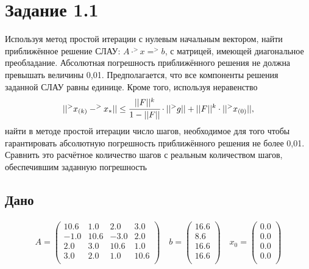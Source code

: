\documentclass[letterpaper, 11pt]{extarticle}
\begin{document}


\section*{Задание 1.1}

Используя метод простой итерации с нулевым начальным вектором, найти приближённое
решение СЛАУ: $A \cdot ^>x = ^>b$, с матрицей, имеющей диагональное преобладание.
Абсолютная погрешность приближённого решения не должна превышать величины 0,01.
Предполагается, что все компоненты решения заданной СЛАУ равны единице.
Кроме того, используя неравенство\\
\begin{equation*}
    ||^>x_{(k)} - ^>x_{*}|| \leq 
    \cfrac{||F||^k}{1 - ||F||} \cdot ||^>g|| + ||F||^k \cdot ||^>x_{(0)}||,
\end{equation*}
найти в методе простой итерации число шагов,
необходимое для того чтобы гарантировать абсолютную погрешность приближённого
решения не более 0,01. Сравнить это расчётное количество шагов с реальным количеством
шагов, обеспечившим заданную погрешность

\subsection*{Дано}

\begin{align*}
    A = \begin{pmatrix}
        10.6 & 1.0 & 2.0 & 3.0 \\
        -1.0 & 10.6 & -3.0 & 2.0 \\
        2.0 & 3.0 & 10.6 & 1.0 \\
        3.0 & 2.0 & 1.0 & 10.6 \\
    \end{pmatrix}
    \quad
    b = \begin{pmatrix}
        16.6 \\
        8.6 \\
        16.6 \\
        16.6 \\
    \end{pmatrix}
    \quad
    x_0 = \begin{pmatrix}
        0.0 \\
        0.0 \\
        0.0 \\
        0.0 \\
    \end{pmatrix}
\end{align*}
\end{document}
